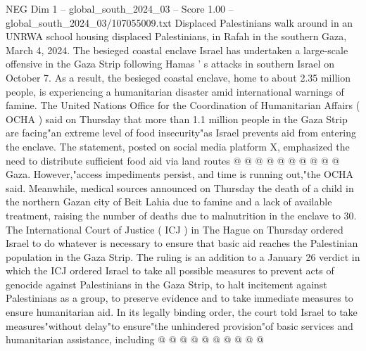 \begin{textsample}{NEG Dim 1 – global\_south\_2024\_03 – Score 1.00 – global\_south\_2024\_03/107055009.txt}
Displaced Palestinians walk around in an UNRWA school housing displaced Palestinians, in Rafah in the southern Gaza, March 4, 2024.
The besieged coastal enclave Israel has undertaken a large-scale offensive in the Gaza Strip following Hamas ' s attacks in southern Israel on October 7.
As a result, the besieged coastal enclave, home to about 2.35 million people, is experiencing a humanitarian disaster amid international warnings of famine.
The United Nations Office for the Coordination of Humanitarian Affairs ( OCHA ) said on Thursday that more than 1.1 million people in the Gaza Strip are facing"an extreme level of food insecurity"as Israel prevents aid from entering the enclave.
The statement, posted on social media platform X, emphasized the need to distribute sufficient food aid via land routes @ @ @ @ @ @ @ @ @ @ Gaza.
However,"access impediments persist, and time is running out,"the OCHA said.
Meanwhile, medical sources announced on Thursday the death of a child in the northern Gazan city of Beit Lahia due to famine and a lack of available treatment, raising the number of deaths due to malnutrition in the enclave to 30.
The International Court of Justice ( ICJ ) in The Hague on Thursday ordered Israel to do whatever is necessary to ensure that basic aid reaches the Palestinian population in the Gaza Strip.
The ruling is an addition to a January 26 verdict in which the ICJ ordered Israel to take all possible measures to prevent acts of genocide against Palestinians in the Gaza Strip, to halt incitement against Palestinians as a group, to preserve evidence and to take immediate measures to ensure humanitarian aid.
In its legally binding order, the court told Israel to take measures"without delay"to ensure"the unhindered provision"of basic services and humanitarian assistance, including @ @ @ @ @ @ @ @ @ @

\end{textsample}
